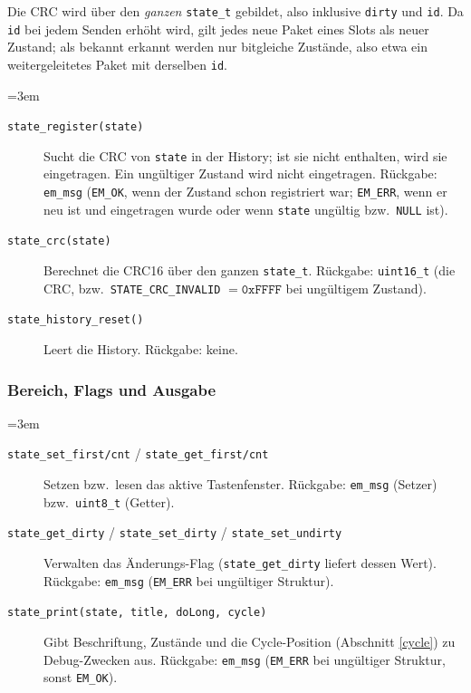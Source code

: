 Die CRC wird über den \emph{ganzen} \verb|state_t| gebildet, also inklusive
\verb|dirty| und \verb|id|. Da \verb|id| bei jedem Senden erhöht wird, gilt
jedes neue Paket eines Slots als neuer Zustand; als bekannt erkannt werden nur
bitgleiche Zustände, also etwa ein weitergeleitetes Paket mit derselben
\verb|id|.

{\sloppy\emergencystretch=3em
\begin{description}
\item[\texttt{state\_register(state)}] Sucht die CRC von \verb|state| in der
  History; ist sie nicht enthalten, wird sie eingetragen. Ein ungültiger
  Zustand wird nicht eingetragen. Rückgabe: \verb|em_msg| (\verb|EM_OK|, wenn
  der Zustand schon registriert war; \verb|EM_ERR|, wenn er neu ist und
  eingetragen wurde oder wenn \verb|state| ungültig bzw.\ \verb|NULL| ist).
\item[\texttt{state\_crc(state)}] Berechnet die CRC16 über den ganzen
  \verb|state_t|. Rückgabe: \verb|uint16_t| (die CRC, bzw.\
  \verb|STATE_CRC_INVALID| $= \mathtt{0xFFFF}$ bei ungültigem Zustand).
\item[\texttt{state\_history\_reset()}] Leert die History. Rückgabe: keine.
\end{description}
\par}

\subsubsection*{Bereich, Flags und Ausgabe}
{\sloppy\emergencystretch=3em
\begin{description}
\item[\texttt{state\_set\_first/cnt} / \texttt{state\_get\_first/cnt}] Setzen
  bzw.\ lesen das aktive Tastenfenster. Rückgabe: \verb|em_msg| (Setzer) bzw.\
  \verb|uint8_t| (Getter).
\item[\texttt{state\_get\_dirty} / \texttt{state\_set\_dirty} /
  \texttt{state\_set\_undirty}] Verwalten das Änderungs-Flag
  (\verb|state_get_dirty| liefert dessen Wert). Rückgabe: \verb|em_msg|
  (\verb|EM_ERR| bei ungültiger Struktur).
\item[\texttt{state\_print(state, title, doLong, cycle)}] Gibt Beschriftung,
  Zustände und die Cycle-Position (Abschnitt \ref{cycle}) zu Debug-Zwecken
  aus. Rückgabe: \verb|em_msg| (\verb|EM_ERR| bei ungültiger Struktur, sonst
  \verb|EM_OK|).
\end{description}
\par}
